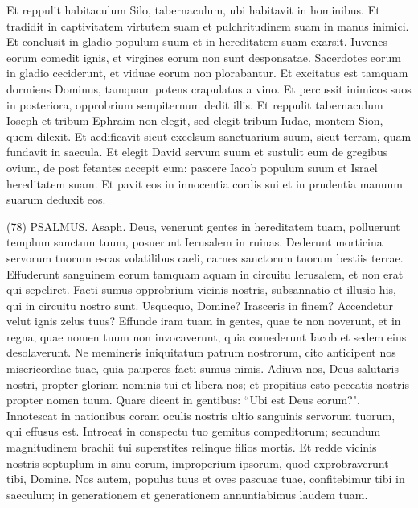 \begin{biblechapter}
\verse Et reppulit habitaculum Silo, tabernaculum, ubi habitavit in hominibus. 
\verse Et tradidit in captivitatem virtutem suam et pulchritudinem suam in manus inimici. 
\verse Et conclusit in gladio populum suum et in hereditatem suam exarsit. 
\verse Iuvenes eorum comedit ignis, et virgines eorum non sunt desponsatae. 
\verse Sacerdotes eorum in gladio ceciderunt, et viduae eorum non plorabantur. 
\verse Et excitatus est tamquam dormiens Dominus, tamquam potens crapulatus a vino. 
\verse Et percussit inimicos suos in posteriora, opprobrium sempiternum dedit illis. 
\verse Et reppulit tabernaculum Ioseph et tribum Ephraim non elegit, 
\verse sed elegit tribum Iudae, montem Sion, quem dilexit. 
\verse Et aedificavit sicut excelsum sanctuarium suum, sicut terram, quam fundavit in saecula. 
\verse Et elegit David servum suum et sustulit eum de gregibus ovium, 
\verse de post fetantes accepit eum: pascere Iacob populum suum et Israel hereditatem suam. 
\verse Et pavit eos in innocentia cordis sui et in prudentia manuum suarum deduxit eos. 
\end{biblechapter}

\begin{biblechapter}  (78) 
\verse  PSALMUS. Asaph. Deus, venerunt gentes in hereditatem tuam, polluerunt templum sanctum tuum, posuerunt Ierusalem in ruinas. 
\verse Dederunt morticina servorum tuorum escas volatilibus caeli, carnes sanctorum tuorum bestiis terrae. 
\verse Effuderunt sanguinem eorum tamquam aquam in circuitu Ierusalem, et non erat qui sepeliret. 
\verse Facti sumus opprobrium vicinis nostris, subsannatio et illusio his, qui in circuitu nostro sunt. 
\verse Usquequo, Domine? Irasceris in finem? Accendetur velut ignis zelus tuus? 
\verse Effunde iram tuam in gentes, quae te non noverunt, et in regna, quae nomen tuum non invocaverunt, 
\verse quia comederunt Iacob et sedem eius desolaverunt. 
\verse Ne memineris iniquitatum patrum nostrorum, cito anticipent nos misericordiae tuae, quia pauperes facti sumus nimis. 
\verse Adiuva nos, Deus salutaris nostri, propter gloriam nominis tui et libera nos; et propitius esto peccatis nostris propter nomen tuum. 
\verse Quare dicent in gentibus: “Ubi est Deus eorum?". Innotescat in nationibus coram oculis nostris ultio sanguinis servorum tuorum, qui effusus est. 
\verse Introeat in conspectu tuo gemitus compeditorum; secundum magnitudinem brachii tui superstites relinque filios mortis. 
\verse Et redde vicinis nostris septuplum in sinu eorum, improperium ipsorum, quod exprobraverunt tibi, Domine. 
\verse Nos autem, populus tuus et oves pascuae tuae, confitebimur tibi in saeculum; in generationem et generationem annuntiabimus laudem tuam. 
\end{biblechapter}


